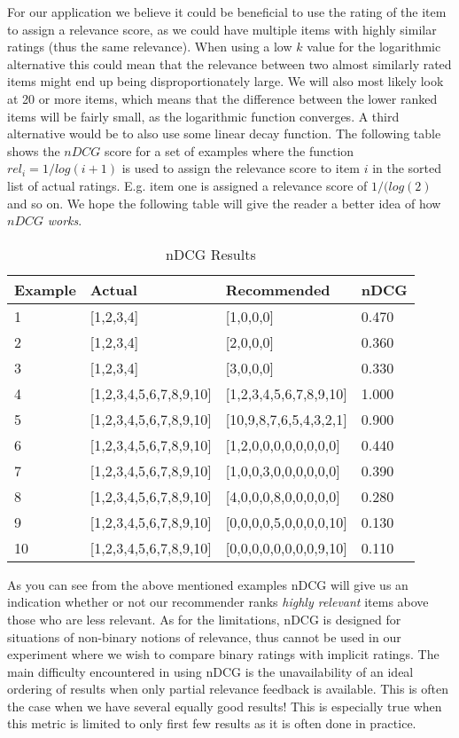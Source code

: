 For our application we believe it could be beneficial to use the rating of the item to assign a
relevance score, as we could have multiple items with highly similar ratings (thus the same relevance). When using a low $k$ value for the logarithmic alternative this could mean that the relevance between two almost similarly rated items might end up being disproportionately large. We will also most likely look at 20 or more items, which means that the difference between the lower ranked items will be fairly small, as the logarithmic function converges. A third alternative would be to also use some linear decay function. The following table shows the $nDCG$ score for a set of examples where the function $rel_i = 1/log(i+1)$ is used to assign the relevance score to item $i$ in the sorted list of actual ratings. E.g. item one is assigned a relevance score of $1/(log(2)$ and so on. We hope the following table will give the reader a better idea of how $nDCG$ \emph{works}.

\begin{table}[H]
\label{table:ndcg}
\centering
\begin{tabular}{*{4}l}
\toprule
Example 	& 	Actual					& 	Recommended				&	nDCG 	\\ \midrule
1			& 	[1,2,3,4]				&	[1,0,0,0]				&	0.470   \\ 
2			& 	[1,2,3,4]				&	[2,0,0,0]				&	0.360   \\ 
3			& 	[1,2,3,4]				&	[3,0,0,0]				&	0.330   \\ 
4			& 	[1,2,3,4,5,6,7,8,9,10] 	& 	[1,2,3,4,5,6,7,8,9,10] 	&   1.000	\\ 
5			& 	[1,2,3,4,5,6,7,8,9,10] 	& 	[10,9,8,7,6,5,4,3,2,1] 	&   0.900	\\ 
6			&	[1,2,3,4,5,6,7,8,9,10] 	& 	[1,2,0,0,0,0,0,0,0,0] 	&   0.440	\\ 
7			& 	[1,2,3,4,5,6,7,8,9,10] 	& 	[1,0,0,3,0,0,0,0,0,0] 	&   0.390	\\ 
8			& 	[1,2,3,4,5,6,7,8,9,10] 	& 	[4,0,0,0,8,0,0,0,0,0] 	&   0.280	\\ 
9			& 	[1,2,3,4,5,6,7,8,9,10] 	& 	[0,0,0,0,5,0,0,0,0,10] 	&   0.130	\\ 
10			& 	[1,2,3,4,5,6,7,8,9,10] 	& 	[0,0,0,0,0,0,0,0,9,10]	&   0.110	\\
\bottomrule
\end{tabular}
\caption{nDCG Results}
\end{table}

As you can see from the above mentioned examples nDCG will give us an indication whether or not our recommender
ranks \emph{highly relevant} items above those who are less relevant. As for the limitations, nDCG is designed for situations of non-binary notions of relevance, thus cannot be used in our experiment where we wish to compare binary ratings with implicit ratings. The main difficulty encountered in using nDCG is the unavailability of an ideal ordering of results when only partial relevance feedback is available. This is often the case when we have several equally good results! This is especially true when this metric is limited to only first few results as it is often done in practice.

